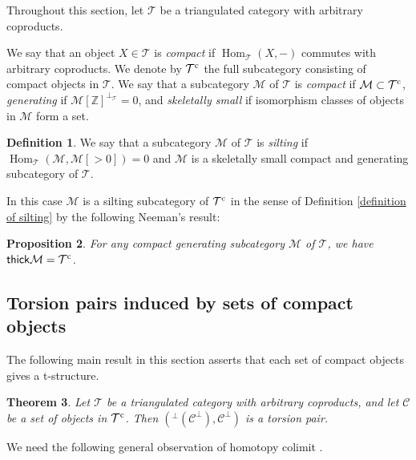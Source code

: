 \documentclass[a4paper,reqno]{amsart}
\newtheorem{theorem}{Theorem}[section]
\newtheorem{proposition}[theorem]{Proposition}
\theoremstyle{definition}
\newtheorem{definition}[theorem]{Definition}
\newcommand{\CC}{{\mathcal C}}
\newcommand{\TT}{{\mathcal T}}
\newcommand{\MM}{{\mathcal M}}
\newcommand{\Z}{\mathbb{Z}}
\newcommand{\thick}{\mathsf{thick}}
\newcommand{\Hom}{\operatorname{Hom}\nolimits}
\begin{document}
\medskip
Throughout this section, let $\TT$ be a triangulated category with arbitrary coproducts.

We say that an object $X\in\TT$ is \emph{compact} 
if $\Hom_{\TT}(X,-)$ commutes with arbitrary coproducts.
We denote by $\TT^{\rm c}$ the full subcategory consisting of compact objects in $\TT$.
We say that a subcategory $\MM$ of $\TT$ is \emph{compact} if $\MM\subset\TT^{\rm c}$,
\emph{generating} if $\MM[\Z]^{\perp_{\TT}}=0$, and
\emph{skeletally small} if isomorphism classes of objects in $\MM$ form a set.

\begin{definition}\label{silting coproducts}
We say that a subcategory $\MM$ of $\TT$ is \emph{silting} if 
$\Hom_{\TT}(\MM,\MM[>0])=0$ and $\MM$ is a skeletally small compact and generating subcategory of $\TT$.
\end{definition}



In this case $\MM$ is a silting subcategory of $\TT^{\rm c}$ in the sense of Definition \ref{definition of silting}
by the following Neeman's result:

\begin{proposition}\cite{N}\label{Neeman}
For any compact generating subcategory $\MM$ of $\TT$, we have $\thick\MM=\TT^{\rm c}$.
\end{proposition}

\subsection{Torsion pairs induced by sets of compact objects}\label{Torsion pairs in triangulated categories induced by compact objects}

The following main result in this section asserts that each set of compact objects gives a t-structure.

\begin{theorem}\label{torsion pair}
Let $\TT$ be a triangulated category with arbitrary coproducts,
and let $\CC$ be a set of objects in $\TT^{\rm c}$.
Then $({}^\perp(\CC^\perp),\CC^\perp)$ is a torsion pair.
\end{theorem}

We need the following general observation of homotopy colimit \cite{N}.
\end{document}

